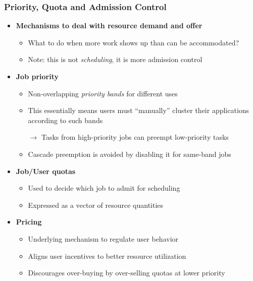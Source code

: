 \begin{frame}
\frametitle{Priority, Quota and Admission Control}
\begin{itemize}
	\item {\bf Mechanisms to deal with resource demand and offer}
	\begin{itemize}
		\item What to do when more work shows up than can be accommodated?
		\item Note: this is not {\it scheduling}, it is more admission control
	\end{itemize}
	\item {\bf Job priority}
	\begin{itemize}
		\item Non-overlapping {\it priority bands} for different uses
		\item This essentially means users must ``manually'' cluster their applications according to such bands
		\item[$\to$] Tasks from high-priority jobs can preempt low-priority tasks
		\item Cascade preemption is avoided by disabling it for same-band jobs
	\end{itemize}
	\item {\bf Job/User quotas}
	\begin{itemize}
		\item Used to decide which job to admit for scheduling
		\item Expressed as a vector of resource quantities
	\end{itemize}
	\item {\bf Pricing}
	\begin{itemize}
		\item Underlying mechanism to regulate user behavior
		\item Aligns user incentives to better resource utilization
		\item Discourages over-buying by over-selling quotas at lower priority
	\end{itemize}
\end{itemize}
\end{frame}

